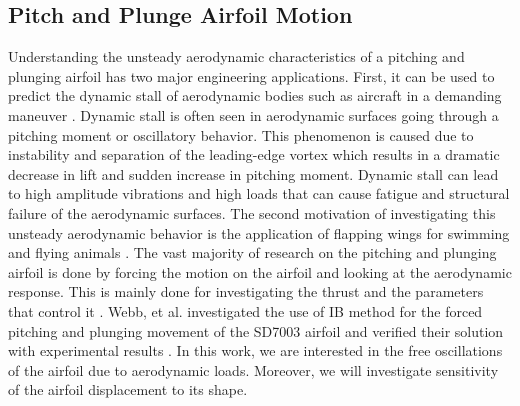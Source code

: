 \subsection{Pitch and Plunge Airfoil Motion}
Understanding the unsteady aerodynamic characteristics of a pitching and plunging airfoil has two major engineering applications. First, it can be used to predict the dynamic stall of aerodynamic bodies such as aircraft in a demanding maneuver \cite{tuncer1998computational}. Dynamic stall is often seen in aerodynamic surfaces going through a pitching moment or oscillatory behavior. This phenomenon is caused due to instability and separation of the leading-edge vortex which results in a dramatic decrease in lift and sudden increase in pitching moment. Dynamic stall can lead to high amplitude vibrations and high loads that can cause fatigue and structural failure of the aerodynamic surfaces. The second motivation of investigating this unsteady aerodynamic behavior is the application of flapping wings for swimming and flying animals \cite{shyy2008computational}. The vast majority of research on the pitching and plunging airfoil is done by forcing the motion on the airfoil and looking at the aerodynamic response. This is mainly done for investigating the thrust and the parameters that control it \cite{tuncer2000computational, lian2008comparative}. Webb, et al. investigated the use of IB method for the forced pitching and plunging movement of the SD7003 airfoil and verified their solution with experimental results \cite{webb2008effects}. In this work, we are interested in the free oscillations of the airfoil due to aerodynamic loads. Moreover, we will investigate sensitivity of the airfoil displacement to its shape.

